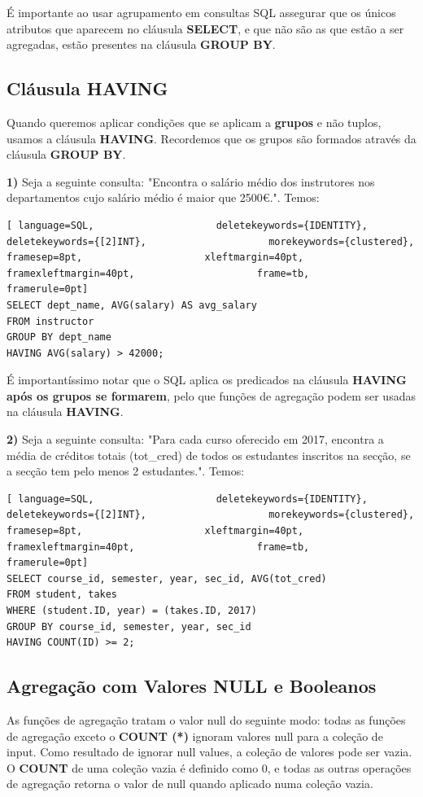 \documentclass[oneside]{book}
\theoremstyle{definition}
\begin{document}
É importante ao usar agrupamento em consultas SQL assegurar que os únicos atributos que aparecem no cláusula \textbf{SELECT}, e que não são as que estão a ser agregadas, estão presentes na cláusula \textbf{GROUP BY}.

\subsection{Cláusula HAVING}
Quando queremos aplicar condições que se aplicam a \textbf{grupos} e não tuplos, usamos a cláusula \textbf{HAVING}. Recordemos que os grupos são formados através da cláusula \textbf{GROUP BY}.

\textbf{1)} Seja a seguinte consulta: "Encontra o salário médio dos instrutores nos departamentos cujo salário médio é maior que 2500€.". Temos:
\begin{lstlisting}[ language=SQL,                     deletekeywords={IDENTITY},                     deletekeywords={[2]INT},                     morekeywords={clustered},                     framesep=8pt,                     xleftmargin=40pt,                     framexleftmargin=40pt,                     frame=tb,                     framerule=0pt]
SELECT dept_name, AVG(salary) AS avg_salary
FROM instructor
GROUP BY dept_name
HAVING AVG(salary) > 42000;
\end{lstlisting}
É importantíssimo notar que o SQL aplica os predicados na cláusula \textbf{HAVING} \textbf{após os grupos se formarem}, pelo que funções de agregação podem ser usadas na cláusula \textbf{HAVING}.

\textbf{2)} Seja a seguinte consulta: "Para cada curso oferecido em 2017, encontra a média de créditos totais (tot\_cred) de todos os estudantes inscritos na secção, se a secção tem pelo menos 2 estudantes.". Temos:
\begin{lstlisting}[ language=SQL,                     deletekeywords={IDENTITY},                     deletekeywords={[2]INT},                     morekeywords={clustered},                     framesep=8pt,                     xleftmargin=40pt,                     framexleftmargin=40pt,                     frame=tb,                     framerule=0pt]
SELECT course_id, semester, year, sec_id, AVG(tot_cred)
FROM student, takes
WHERE (student.ID, year) = (takes.ID, 2017)
GROUP BY course_id, semester, year, sec_id
HAVING COUNT(ID) >= 2;
\end{lstlisting}

\subsection{Agregação com Valores NULL e Booleanos}
As funções de agregação tratam o valor null do seguinte modo: todas as funções de agregação exceto o \textbf{COUNT (*)} ignoram valores null para a coleção de input. Como resultado de ignorar null values, a coleção de valores pode ser vazia. O \textbf{COUNT} de uma coleção vazia é definido como 0, e todas as outras operações de agregação retorna o valor de null quando aplicado numa coleção vazia.
\end{document}
